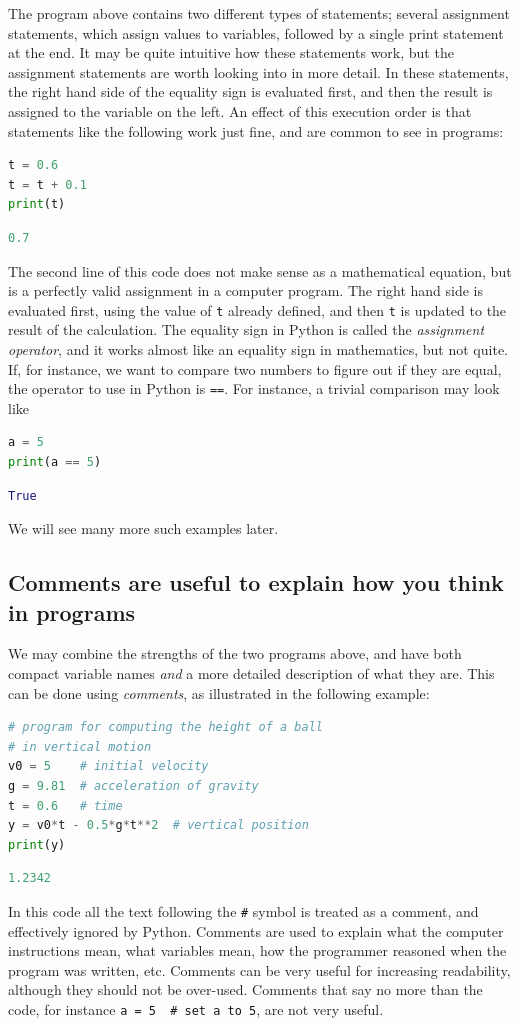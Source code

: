 \documentclass[graybox,envcountchap,sectrefs,final]{svmonodo}
\begin{document}
The program above contains two different types of statements; several assignment statements, which assign values to variables,
followed by a single print statement at the end. It may be quite intuitive how these statements work, but the assignment statements
are worth looking into in more detail. In these statements, the right hand side of the equality sign is evaluated first, and then
the result is assigned to the variable on the left. An effect of this execution order is that statements like the following work just
fine, and are common to see in programs:
\begin{lstlisting}[language=Python,style=blue1]
t = 0.6
t = t + 0.1
print(t)
\end{lstlisting}
\begin{lstlisting}[language=Python,style=gray]
0.7
\end{lstlisting}
The second line of this code does not make sense as a mathematical equation, but is a perfectly valid assignment in a computer
program. The right hand side is
evaluated first, using the value of \texttt{t} already defined, and then \texttt{t} is updated to the result of the calculation. The
equality sign in Python is called the \emph{assignment operator}, and it works almost like an equality sign in mathematics, but not quite.
If, for instance, we want to compare two numbers to figure out if they are equal, the operator to use in Python is \texttt{==}. For instance,
a trivial comparison may look like
\begin{lstlisting}[language=Python,style=blue1]
a = 5
print(a == 5)
\end{lstlisting}
\begin{lstlisting}[language=Python,style=gray]
True
\end{lstlisting}
We will see many more such examples later.

\subsection{Comments are useful to explain how you think in programs}
We may combine the strengths of the two programs above, and have both compact variable names \emph{and} a
more detailed description of what they are. This can be done using \emph{comments}, as illustrated in the
following example:
\begin{lstlisting}[language=Python,style=blue1]
# program for computing the height of a ball
# in vertical motion
v0 = 5    # initial velocity
g = 9.81  # acceleration of gravity
t = 0.6   # time
y = v0*t - 0.5*g*t**2  # vertical position
print(y)
\end{lstlisting}
\begin{lstlisting}[language=Python,style=gray]
1.2342
\end{lstlisting}
In this code all the text following the \Verb!#! symbol is treated as a comment, and effectively ignored by Python.
Comments are used to explain what the computer instructions mean, what variables mean, how the
programmer reasoned when the program was written, etc. Comments can be very useful for increasing readability,
although they should not be over-used. Comments that say no more than the code, for instance \Verb!a = 5  # set a to 5!,
are not very useful.
\end{document}
